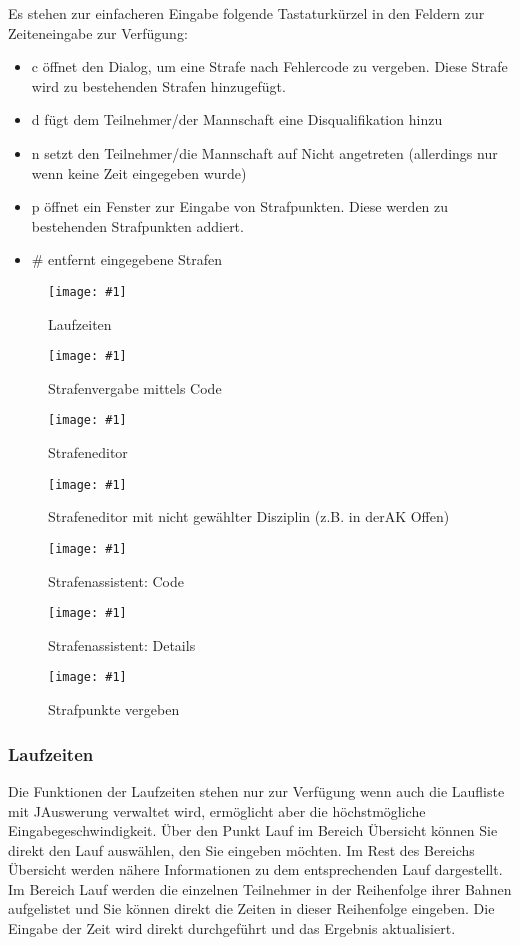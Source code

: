 \documentclass[11pt,a4paper,twoside,ngerman]{article}
\newcommand{\hsmimage}[3]{\begin{figure}[!ht]\centering\texttt{[image: \#1]}\caption{#3}\end{figure}}
\begin{document}
Es stehen zur einfacheren Eingabe folgende Tastaturkürzel in den Feldern zur Zeiteneingabe zur Verfügung:
\begin{itemize}

\item \glqq{}c\grqq{} öffnet den Dialog, um eine Strafe nach Fehlercode zu vergeben. Diese Strafe wird zu bestehenden Strafen hinzugefügt.


\item \glqq{}d\grqq{} fügt dem Teilnehmer/der Mannschaft eine \glqq{}Disqualifikation\grqq{} hinzu


\item \glqq{}n\grqq{} setzt den Teilnehmer/die Mannschaft auf \glqq{}Nicht angetreten\grqq{} (allerdings nur wenn keine Zeit eingegeben wurde)


\item \glqq{}p\grqq{} öffnet ein Fenster zur Eingabe von Strafpunkten. Diese werden zu bestehenden Strafpunkten addiert.


\item \glqq{}\#\grqq{} entfernt eingegebene Strafen


\end{itemize}



\hsmimage{pics/panel-laufzeiten}{.80\textwidth}{Laufzeiten}

\hsmimage{pics/strafencode}{.30\textwidth}{Strafenvergabe mittels Code}

\hsmimage{pics/strafeneditor}{.56\textwidth}{Strafeneditor}

\hsmimage{pics/strafeneditor-disziplin-nicht-gewaehlt}{.56\textwidth}{Strafeneditor mit nicht gewählter Disziplin (z.B. in derAK Offen)}

\hsmimage{pics/strafenwizard-code}{.49\textwidth}{Strafenassistent: Code}

\hsmimage{pics/strafenwizard-details}{.49\textwidth}{Strafenassistent: Details}

\hsmimage{pics/strafpunkte}{.30\textwidth}{Strafpunkte vergeben}

\subsubsection*{Laufzeiten}
Die Funktionen der \glqq{}Laufzeiten\grqq{} stehen nur zur Verfügung wenn auch die Laufliste mit JAuswerung verwaltet wird, ermöglicht aber die höchstmögliche Eingabegeschwindigkeit. Über den Punkt \glqq{}Lauf\grqq{} im Bereich \glqq{}Übersicht\grqq{} können Sie direkt den Lauf auswählen, den Sie eingeben möchten. Im Rest des Bereichs \glqq{}Übersicht\grqq{} werden nähere Informationen zu dem entsprechenden Lauf dargestellt. Im Bereich \glqq{}Lauf\grqq{} werden die einzelnen Teilnehmer in der Reihenfolge ihrer Bahnen aufgelistet und Sie können direkt die Zeiten in dieser Reihenfolge eingeben. Die Eingabe der Zeit wird direkt durchgeführt und das Ergebnis aktualisiert.
\end{document}
